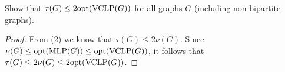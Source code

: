 



    \begin{thm}{}{}
        Show that $\tau(G) \leq 2{\rm opt}({\rm VCLP}(G))$ for all graphs $G$ (including non-bipartite graphs).
    \end{thm}

    \begin{proof}
        From (2) we know that $\tau(G) \leq 2\nu(G)$. Since $\nu(G) \leq {\rm opt}({\rm MLP}(G)) \leq {\rm opt}({\rm VCLP}(G))$, it follows that $\tau(G) \leq 2\nu(G) \leq 2{\rm opt}({\rm VCLP}(G))$.
    \end{proof}




